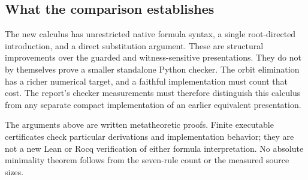 \subsection{What the comparison establishes}

The new calculus has unrestricted native formula syntax, a single
root-directed introduction, and a direct substitution argument.  These
are structural improvements over the guarded and witness-sensitive
presentations.  They do not by themselves prove a smaller standalone
Python checker.  The orbit elimination has a richer numerical target,
and a faithful implementation must count that cost.  The report's
checker measurements must therefore distinguish this calculus from any
separate compact implementation of an earlier equivalent presentation.

The arguments above are written metatheoretic proofs.  Finite executable
certificates check particular derivations and implementation behavior;
they are not a new Lean or Rocq verification of either formula
interpretation.  No absolute minimality theorem follows from the
seven-rule count or the measured source sizes.
